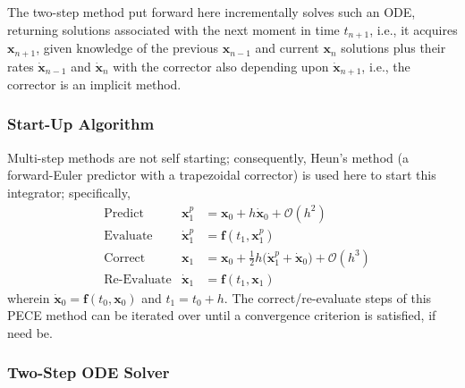 The two-step method put forward here incrementally solves such an ODE, returning solutions associated with the next moment in time $t_{n+1}$, i.e., it acquires $\mathbf{x}_{n+1}$, given knowledge of the  previous $\mathbf{x}_{n-1}$ and current $\mathbf{x}_n$ solutions plus their rates $\dot{\mathbf{x}}_{n-1}$ and $\dot{\mathbf{x}}_n$ with the corrector also depending upon $\dot{\mathbf{x}}_{n+1}$, i.e., the corrector is an implicit method.

\subsubsection{Start-Up Algorithm}

Multi-step methods are not self starting; consequently, Heun's method (a forward-Euler predictor with a trapezoidal corrector) is used here to start this integrator; specifically,
\begin{subequations}
    \label{startUp1stOrderODEs}
    \begin{align}
    \mbox{} & \text{Predict} & 
    \mathbf{x}_1^p & = \mathbf{x}_0 + h \dot{\mathbf{x}}_0 + \mathcal{O} (h^2)
    \label{startUp1stOrderPredictor} \\
    \mbox{} & \text{Evaluate} & 
    \dot{\mathbf{x}}^p_1 & = \mathbf{f} (t_1 , \mathbf{x}_1^p) 
    \label{startUp1stEvaluate} \\
    \mbox{} & \text{Correct} &
    \mathbf{x}_1 & = \mathbf{x}_0 + \tfrac{1}{2} h 
    \bigl( \dot{\mathbf{x}}_1^p + \dot{\mathbf{x}}_0 \bigr) + \mathcal{O} (h^3)
    \label{startUp1stOrderCorrector} \\
    \mbox{} & \text{Re-Evaluate} & 
    \dot{\mathbf{x}}_1 & = \mathbf{f} (t_1 , \mathbf{x}_1) 
    \label{startUp1stReEvaluate}
    \end{align}
\end{subequations}
wherein $\dot{\mathbf{x}}_0 = \mathbf{f}(t_0, \mathbf{x}_0)$ and $t_1 = t_0 + h$.  The correct\slash re-evaluate steps of this PECE method can be iterated over until a convergence criterion is satisfied, if need be.

\subsubsection{Two-Step ODE Solver}


